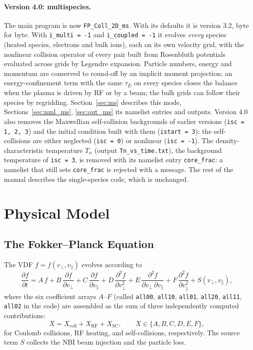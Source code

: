 \documentclass[11pt,a4paper]{article}
\newcommand{\vp}{v_\perp}
\newcommand{\vpa}{v_\parallel}
\newcommand{\fvdf}{f(\vp,\vpa)}
\begin{document}
\paragraph{Version 4.0: multispecies.}  The main program is now \texttt{FP\_Coll\_2D\_ms}.  With its
defaults it is version 3.2, byte for byte.  With \texttt{i\_multi = -1} and
\texttt{i\_coupled = -1} it evolves \emph{every} species (heated species, electrons and bulk ions),
each on its own velocity grid, with the nonlinear collision operator of every pair built from
Rosenbluth potentials evaluated across grids by Legendre expansion.  Particle numbers, energy and
momentum are conserved to round-off by an implicit moment projection; an energy-confinement term
with the same $\tau_E$ on every species closes the balance when the plasma is driven by RF or by a
beam; the bulk grids can follow their species by regridding.  Section~\ref{sec:ms} describes this
mode, Sections~\ref{sec:nml_ms}, \ref{sec:out_ms} its namelist entries and outputs.  Version 4.0
also removes the Maxwellian self-collision backgrounds of earlier versions (\texttt{isc = 1, 2, 3})
and the initial condition built with them (\texttt{istart = 3}): the self-collisions are either
neglected (\texttt{isc = 0}) or nonlinear (\texttt{isc = -1}).  The density-characteristic
temperature $T_n$ (output \texttt{Tn\_vs\_time.txt}), the background temperature of \texttt{isc = 3},
is removed with its namelist entry \texttt{core\_frac}: a namelist that still sets
\texttt{core\_frac} is rejected with a message.  The rest of the
manual describes the single-species code, which is unchanged.


\section{Physical Model}

\subsection{The Fokker--Planck Equation}

The VDF $f = \fvdf$ evolves according to
\begin{equation}
\label{eq:FP}
  \frac{\partial f}{\partial t} =
    A\,f
  + B\,\frac{\partial f}{\partial \vp}
  + C\,\frac{\partial f}{\partial \vpa}
  + D\,\frac{\partial^2 f}{\partial \vp^2}
  + E\,\frac{\partial^2 f}{\partial \vp\,\partial \vpa}
  + F\,\frac{\partial^2 f}{\partial \vpa^2}
  + S(\vp,\vpa),
\end{equation}
where the six coefficient arrays $A$--$F$ (called \texttt{all00}, \texttt{all10},
\texttt{all01}, \texttt{all20}, \texttt{all11}, \texttt{all02} in the code) are
assembled as the sum of three independently computed contributions:
\begin{equation}
  X = X_{\mathrm{coll}} + X_{\mathrm{RF}} + X_{\mathrm{SC}},
  \qquad X \in \{A,B,C,D,E,F\},
\end{equation}
for Coulomb collisions, RF heating, and self-collisions, respectively.
The source term $S$ collects the NBI beam injection and the particle loss.
\end{document}
